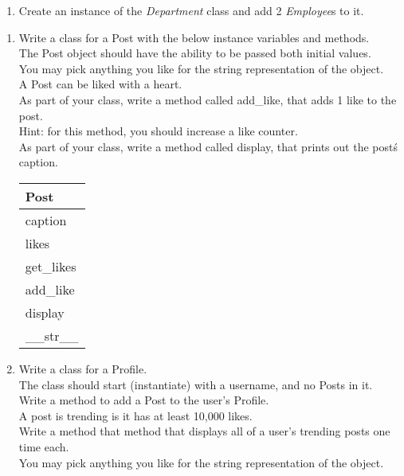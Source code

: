 \begin{enumerate}
		\item
			Create an instance of the \textit{Department} class and add 2 \textit{Employee}s to it.
	\end{enumerate}
\pagebreak


	\item
	\begin{enumerate}
		\item
			Write a class for a Post with the below instance variables and methods.\\ 
			The Post object should have the ability to be passed both initial values.\\  
			You may pick anything you like for the string representation of the object.\\
			A Post can be liked with a heart.\\  
			As part of your class, write a method called add\_like, that adds 1 like to the post.\\
				\tab Hint: for this method, you should increase a like counter.\\
			As part of your class, write a method called display, that prints out the post\'s caption.\\			
			\begin{flushright}
			\begin{tabular}{|l|}
				\hline
				Post\\ \hline
				caption\\	likes\\	 \hline
				get\_likes \\ add\_like \\ display \\ \_\_str\_\_ \\ \hline
			\end{tabular}
			\end{flushright}

		\item
			Write a class for a Profile. \\
			The class should start (instantiate) with a username, and no Posts in it. \\ 
			Write a method to add a Post to the user's Profile.\\
			A post is trending is it has at least 10,000 likes.	 \\Write a method that method 
			that displays all of a user's trending posts one time each.\\ 	
			You may pick anything you like for the string representation of the object.
	

\end{enumerate}
